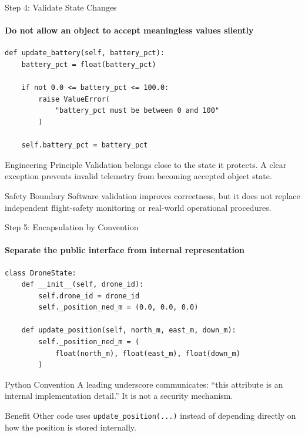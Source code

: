 \begin{frame}[fragile]{Step 4: Validate State Changes}
\framesubtitle{Do not allow an object to accept meaningless values silently}

\begin{verbatim}
def update_battery(self, battery_pct):
    battery_pct = float(battery_pct)

    if not 0.0 <= battery_pct <= 100.0:
        raise ValueError(
            "battery_pct must be between 0 and 100"
        )

    self.battery_pct = battery_pct
\end{verbatim}

\begin{block}{Engineering Principle}
    Validation belongs close to the state it protects. A clear exception prevents
    invalid telemetry from becoming accepted object state.
\end{block}

\begin{alertblock}{Safety Boundary}
    Software validation improves correctness, but it does not replace independent
    flight-safety monitoring or real-world operational procedures.
\end{alertblock}
\end{frame}


\begin{frame}[fragile]{Step 5: Encapsulation by Convention}
\framesubtitle{Separate the public interface from internal representation}

\begin{verbatim}
class DroneState:
    def __init__(self, drone_id):
        self.drone_id = drone_id
        self._position_ned_m = (0.0, 0.0, 0.0)

    def update_position(self, north_m, east_m, down_m):
        self._position_ned_m = (
            float(north_m), float(east_m), float(down_m)
        )
\end{verbatim}

\begin{block}{Python Convention}
    A leading underscore communicates: ``this attribute is an internal
    implementation detail.'' It is not a security mechanism.
\end{block}

\begin{exampleblock}{Benefit}
    Other code uses \texttt{update\_position(...)} instead of depending directly
    on how the position is stored internally.
\end{exampleblock}
\end{frame}


